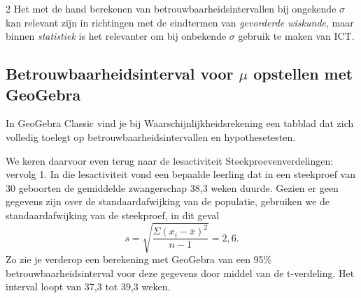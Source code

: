 \begin{multicols}{2}
Het met de hand berekenen van betrouwbaarheidsintervallen bij ongekende $\sigma$ kan relevant zijn in richtingen met de eindtermen van \emph{gevorderde wiskunde}, maar binnen \emph{statistiek} is het relevanter om bij onbekende $\sigma$ gebruik te maken van ICT.

\subsection*{Betrouwbaarheidsinterval voor $\mu$ opstellen met GeoGebra}

In GeoGebra Classic vind je bij Waarschijnlijkheidsrekening een tabblad dat zich volledig toelegt op betrouwbaarheidsintervallen en hypothesetesten. 

We keren daarvoor even terug naar de lesactiviteit Steekproevenverdelingen: vervolg 1. In die lesactiviteit vond een bepaalde leerling dat in een steekproef van 30 geboorten de gemiddelde zwangerschap 38,3 weken duurde. Gezien er geen gegevens zijn over de standaardafwijking van de populatie, gebruiken we de standaardafwijking van de steekproef, in dit geval 
\[s=\sqrt{\frac{\Sigma (x_i-\overline{x})^2}{n-1}}=2,6.\] 
Zo zie je verderop een berekening met GeoGebra van een 95\% betrouwbaarheidsinterval voor deze gegevens door middel van de t-verdeling. Het interval loopt van 37,3 tot 39,3 weken. 
\end{multicols}
\begin{center}
\end{center}
